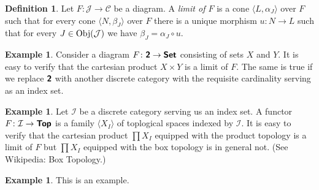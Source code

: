 \documentclass[12pt]{article}
\theoremstyle{definition}
\newtheorem{dfn}[thm]{Definition}
\newtheorem{exm}[thm]{Example}
\theoremstyle{remark}
\newcommand{\catvar}[1]{\mathcal{#1}}
\newcommand{\CC}{\catvar{C}}
\newcommand{\II}{\catvar{I}}
\newcommand{\JJ}{\catvar{J}}
\newcommand{\catname}[1]{\textup{\sffamily\textbf{#1}}}
\newcommand*{\Set}{\catname{Set}}
\newcommand*{\Top}{\catname{Top}}
\newcommand{\Obj}[1]{\textup{Obj}(#1)}
\begin{document}
    \begin{dfn}
        Let $F\colon\JJ\to\CC$ be a diagram. A \emph{limit of $F$} is a cone $\langle L,\alpha_J\rangle$ over $F$ such that for every cone $\langle N,\beta_J\rangle$ over $F$ there is a unique morphism $u\colon N\to L$ such that for every $J\in\Obj{\JJ}$ we have $\beta_J=\alpha_J\circ u$.
    \end{dfn}

    \begin{exm}
        Consider a diagram $F\colon\catname{2}\to\Set$ consisting of sets $X$ and $Y$. It is easy to verify that the cartesian product $X\times Y$ is a limit of $F$. The same is true if we replace $\catname{2}$ with another discrete category with the requisite cardinality serving as an index set.
    \end{exm}

    \begin{exm}
        Let $\II$ be a discrete category serving us an index set. A functor $F\colon\II\to\Top$ is a family $\langle X_I\rangle$ of toplogical spaces indexed by $\II$. It is easy to verify that the cartesian product $\prod X_I$ equipped with the product topology is a limit of $F$ but $\prod X_I$ equipped with the box topology is in general not. (See Wikipedia: Box Topology.)
    \end{exm}

    \begin{exm}
        This is an example.
    \end{exm}
\end{document}
